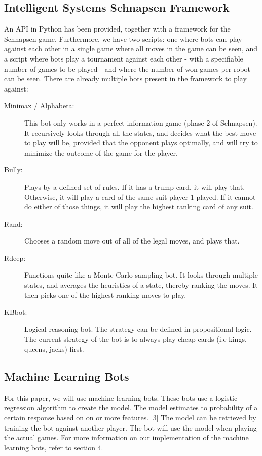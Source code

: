 \documentclass[a4paper,11pt]{article}
\begin{document}
\subsection{Intelligent Systems Schnapsen Framework}
An API in Python has been provided, together with a framework for the Schnapsen game. Furthermore, we  have two scripts: one where bots can play against each other in a single game where all moves in the game can be seen, and a script where bots play a tournament against each other - with a specifiable number of games to be played - and where the number of won games per robot can be seen. There are already multiple bots present in the framework to play against:
\begin{description}
\item [Minimax / Alphabeta:] This bot only works in a perfect-information game (phase 2 of Schnapsen). It recursively looks through all the states, and decides what the best move to play will be, provided that the opponent plays optimally, and will try to minimize the outcome of the game for the player.
\item [Bully:] Plays by a defined set of rules. If it has a trump card, it will play that. Otherwise, it will play a card of the same suit player 1 played. If it cannot do either of those things, it will play the highest ranking card of any suit.
\item [Rand:] Chooses a random move out of all of the legal moves, and plays that.
\item [Rdeep:] Functions quite like a Monte-Carlo sampling bot. It looks through multiple states, and averages the heuristics of a state, thereby ranking the moves. It then picks one of the highest ranking moves to play.
\item [KBbot:] Logical reasoning bot. The strategy can be defined in propositional logic. The current strategy of the bot is to always play cheap cards (i.e kings, queens, jacks) first.
\end{description}

\subsection{Machine Learning Bots}
For this paper, we will use machine learning bots. These bots use a logistic regression algorithm to create the model. The model estimates to probability of a certain response based on on or more features. [3] The model can be retrieved by training the bot against another player. The bot will use the model when playing the actual games. For more information on our implementation of the machine learning bots, refer to section 4.
\end{document}
